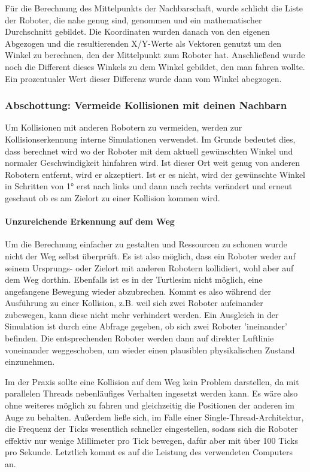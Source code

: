 Für die Berechnung des Mittelpunkts der Nachbarschaft, wurde schlicht die Liste der Roboter, die nahe genug sind, genommen und ein mathematischer Durchschnitt gebildet. Die Koordinaten wurden danach von den eigenen Abgezogen und die resultierenden X/Y-Werte als Vektoren genutzt um den Winkel zu berechnen, den der Mittelpunkt zum Roboter hat. Anschließend wurde noch die Different dieses Winkels zu dem Winkel gebildet, den man fahren wollte. Ein prozentualer Wert dieser Differenz wurde dann vom Winkel abegzogen.

\subsubsection*{Abschottung: Vermeide Kollisionen mit deinen Nachbarn}

Um Kollisionen mit anderen Robotern zu vermeiden, werden zur Kollisionserkennung interne Simulationen verwendet. Im Grunde bedeutet dies, dass berechnet wird wo der Roboter mit dem aktuell gewünschten Winkel und normaler Geschwindigkeit hinfahren wird. Ist dieser Ort weit genug von anderen Robotern entfernt, wird er akzeptiert. Ist er es nicht, wird der gewünschte Winkel in Schritten von 1° erst nach links und dann nach rechts verändert und erneut geschaut ob es am Zielort zu einer Kollision kommen wird.

\paragraph*{Unzureichende Erkennung auf dem Weg}
Um die Berechnung einfacher zu gestalten und Ressourcen zu schonen wurde nicht der Weg selbst überprüft. Es ist also möglich, dass ein Roboter weder auf seinem Ursprungs- oder Zielort mit anderen Robotern kollidiert, wohl aber auf dem Weg dorthin. Ebenfalls ist es in der Turtlesim nicht möglich, eine angefangene Bewegung wieder abzubrechen. Kommt es also während der Ausführung zu einer Kollision, z.B. weil sich zwei Roboter aufeinander zubewegen, kann diese nicht mehr verhindert werden. Ein Ausgleich in der Simulation ist durch eine Abfrage gegeben, ob sich zwei Roboter 'ineinander' befinden. Die entsprechenden Roboter werden dann auf direkter Luftlinie voneinander weggeschoben, um wieder einen plausiblen physikalischen Zustand einzunehmen.

Im der Praxis sollte eine Kollision auf dem Weg kein Problem darstellen, da mit parallelen Threads nebenläufiges Verhalten ingesetzt werden kann. Es wäre also ohne weiteres möglich zu fahren und gleichzeitig die Positionen der anderen im Auge zu behalten. Außerdem ließe sich, im Falle einer Single-Thread-Architektur, die Frequenz der Ticks wesentlich schneller eingestellen, sodass sich die Roboter effektiv nur wenige Millimeter pro Tick bewegen, dafür aber mit über 100 Ticks pro Sekunde. Letztlich kommt es auf die Leistung des verwendeten Computers an.

